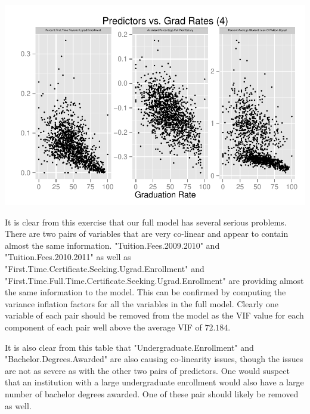 \documentclass{article}
\begin{document}
\includegraphics{Fig-scatter4}

\FloatBarrier

It is clear from this exercise that our full model has several serious problems. There are two pairs of variables that are very co-linear and appear to contain almost the same information. "Tuition.Fees.2009.2010" and "Tuition.Fees.2010.2011" as well as "First.Time.Certificate.Seeking.Ugrad.Enrollment" and "First.Time.Full.Time.Certificate.Seeking.Ugrad.Enrollment" are providing almost the same information to the model. This can be confirmed by computing the variance inflation factors for all the variables in the full model. Clearly one variable of each pair should be removed from the model as the VIF value for each component of each pair well above the average VIF of $72.184$.

It is also clear from this table that "Undergraduate.Enrollment" and "Bachelor.Degrees.Awarded" are also causing co-linearity issues, though the issues are not as severe as with the other two pairs of predictors. One would suspect that an institution with a large undergraduate enrollment would also have a large number of bachelor degrees awarded. One of these pair should likely be removed as well.
\end{document}
